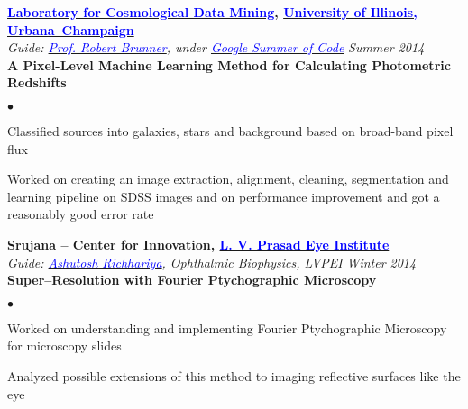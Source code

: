 \documentclass[margin,line]{res}
\newenvironment{list2}{
  \begin{list}{$\bullet$}{%
      \setlength{\itemsep}{0in}
      \setlength{\parsep}{0in} \setlength{\parskip}{0in}
      \setlength{\topsep}{0in} \setlength{\partopsep}{0in} 
      \setlength{\leftmargin}{0.18in}}}{\end{list}}
\begin{document}
\begin{resume}
{\bf \href{http://lcdm.astro.illinois.edu/}{\textcolor{blue} {Laboratory for Cosmological Data Mining}}, \href{http://www.illinois.edu/}{\textcolor{blue}{University of Illinois, Urbana--Champaign}}} \\
{\em Guide: \href{http://www.astro.illinois.edu/people/bigdog}{\textcolor{blue}{Prof. Robert Brunner}}, under \href{https://www.google-melange.com/gsoc/homepage/google/gsoc2014}{\textcolor{blue} {Google Summer of Code}}} \hfill {\it Summer 2014} \\
\vspace*{-.13in}
\textbf{A Pixel-Level Machine Learning Method for Calculating Photometric Redshifts} \\
\vspace*{-.01in}
\begin{list2}
\item Classified sources into galaxies, stars and background based on broad-band pixel flux
\item Worked on creating an image extraction, alignment, cleaning, segmentation and learning pipeline on SDSS images and on performance improvement and got a reasonably good error rate
\end{list2}

\vspace*{-0.13in}

{\bf Srujana -- Center for Innovation, \href{http://www.lvpei.org/}{\textcolor{blue}{L. V. Prasad Eye Institute}}} \\
{\em Guide: \href{http://www.lvpei.org/our-team/our-team-ashutosh.php}{\textcolor{blue}{Ashutosh Richhariya}}, Ophthalmic Biophysics, LVPEI} \hfill {\it Winter 2014} \\
\vspace*{-.13in}
\textbf{Super--Resolution with Fourier Ptychographic Microscopy} \\
\begin{list2}
\item Worked on understanding and implementing Fourier Ptychographic Microscopy for microscopy slides
\item Analyzed possible extensions of this method to imaging reflective surfaces like the eye
\end{list2}



\end{resume}
\end{document}

